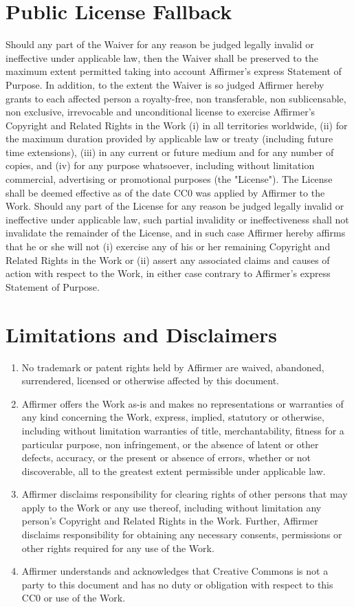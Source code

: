 \section{Public License Fallback}
Should any part of the Waiver for any reason be judged legally invalid or
ineffective under applicable law, then the Waiver shall be preserved to the
maximum extent permitted taking into account Affirmer's express Statement of
Purpose. In addition, to the extent the Waiver is so judged Affirmer hereby
grants to each affected person a royalty-free, non transferable, non
sublicensable, non exclusive, irrevocable and unconditional license to exercise
Affirmer's Copyright and Related Rights in the Work (i) in all territories
worldwide, (ii) for the maximum duration provided by applicable law or treaty
(including future time extensions), (iii) in any current or future medium and
for any number of copies, and (iv) for any purpose whatsoever, including without
limitation commercial, advertising or promotional purposes (the "License"). The
License shall be deemed effective as of the date CC0 was applied by Affirmer to
the Work. Should any part of the License for any reason be judged legally
invalid or ineffective under applicable law, such partial invalidity or
ineffectiveness shall not invalidate the remainder of the License, and in such
case Affirmer hereby affirms that he or she will not (i) exercise any of his or
her remaining Copyright and Related Rights in the Work or (ii) assert any
associated claims and causes of action with respect to the Work, in either case
contrary to Affirmer's express Statement of Purpose.

\section{Limitations and Disclaimers}
\begin{enumerate}
\item No trademark or patent rights held by Affirmer are waived, abandoned,
      surrendered, licensed or otherwise affected by this document.
\item Affirmer offers the Work as-is and makes no representations or warranties
      of any kind concerning the Work, express, implied, statutory or otherwise,
      including without limitation warranties of title, merchantability, fitness
      for a particular purpose, non infringement, or the absence of latent or
      other defects, accuracy, or the present or absence of errors, whether or
      not discoverable, all to the greatest extent permissible under applicable
      law.
\item Affirmer disclaims responsibility for clearing rights of other persons
      that may apply to the Work or any use thereof, including without
      limitation any person's Copyright and Related Rights in the Work. Further,
      Affirmer disclaims responsibility for obtaining any necessary consents,
      permissions or other rights required for any use of the Work.
\item Affirmer understands and acknowledges that Creative Commons is not a party
      to this document and has no duty or obligation with respect to this CC0 or
      use of the Work.
\end{enumerate}
